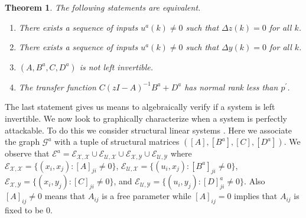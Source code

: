 \documentclass[letterpaper, 10 pt, conference]{ieeeconf}
\newtheorem{theorem}{Theorem}
\begin{document}
\begin{theorem}
The following statements are equivalent.
\begin{enumerate}
\item There exists a sequence of inputs $u^a(k) \neq 0$ such that $\Delta z(k) = 0$ for all $k$.
\item There exists a sequence of inputs $u^a(k) \neq 0$ such that $\Delta y(k) = 0$ for all $k$.
\item $(A,B^a,C,D^a)$ is not left invertible.
\item The transfer function $C(zI-A)^{-1}B^a + D^a$ has normal rank less than $p^\prime$.
\end{enumerate}
\end{theorem}
The last statement gives us means to algebraically verify if a system is left invertible. We now look to graphically characterize when a system is perfectly attackable. To do this we consider structural linear systems \cite{Lin1974}. Here we associate the graph $\mathcal{G}^a$ with a tuple of structural matrices $([A], [B^a], [C], [D^a])$. We observe that $\mathcal{E}^a = \mathcal{E}_{\mathcal{X},\mathcal{X}} \cup \mathcal{E}_{\mathcal{U},\mathcal{X}}  \cup \mathcal{E}_{\mathcal{X},\mathcal{Y}}   \cup \mathcal{E}_{\mathcal{U},\mathcal{Y}}$ where $\mathcal{E}_{\mathcal{X},\mathcal{X}} = \{(x_i,x_j): [A]_{ji} \neq 0\}$, $\mathcal{E}_{\mathcal{U},\mathcal{X}} = \{(u_i,x_j): [B^a]_{ji} \neq 0\}$, $\mathcal{E}_{\mathcal{X},\mathcal{Y}} = \{(x_i,y_j): [C]_{ji} \neq 0\}$, and $\mathcal{E}_{\mathcal{U},\mathcal{Y}} = \{(u_i,y_j): [D]^a_{ji} \neq 0\}$. Also $[A]_{ij} \neq 0$ means that $A_{ij}$ is a free parameter while $[A]_{ij} = 0$ implies that $A_{ij}$ is fixed to be 0.
\end{document}
